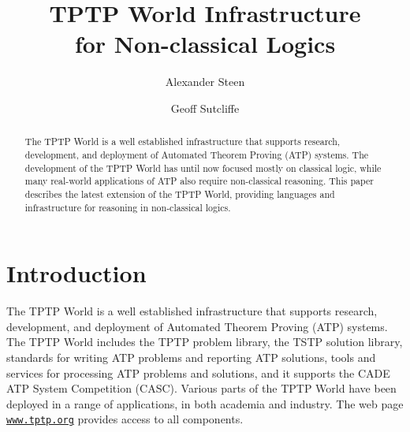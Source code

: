 \documentclass[runningheads]{llncs}
\begin{document}
\title{TPTP World Infrastructure \\ for Non-classical Logics}

\author{Alexander Steen 
\and
Geoff Sutcliffe}

\maketitle
\begin{abstract}
The TPTP World \cite{Sut17} is a well established infrastructure that supports research, 
development, and deployment of Automated Theorem Proving (ATP) systems.
The development of the TPTP World has until now focused mostly on classical logic, while many 
real-world applications of ATP also require non-classical reasoning. 
This paper describes the latest extension of the TPTP World, providing languages and
infrastructure for reasoning in non-classical logics.

\end{abstract}
\section{Introduction}
\label{Introduction}

The TPTP World \cite{Sut17} is a well established infrastructure that supports research, 
development, and deployment of Automated Theorem Proving (ATP) systems.
The TPTP World includes the TPTP problem library,
the TSTP solution library,
standards for writing ATP problems and reporting ATP solutions,
tools and services for processing ATP problems and solutions,
and it supports the CADE ATP System Competition (CASC).
Various parts of the TPTP World have been deployed in a range of applications,
in both academia and industry.
The web page \href{https://www.tptp.org}{\tt www.tptp.org} provides access to all 
components.
\end{document}

